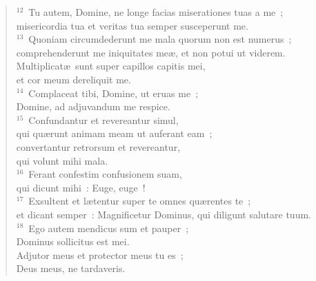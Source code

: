 \begin{flushleft}
\begin{verse}
${}^{12}$~Tu autem, Domine, ne longe facias miserationes tuas a me~;\\ misericordia tua et veritas tua semper susceperunt me.\\
${}^{13}$~Quoniam circumdederunt me mala quorum non est numerus~;\\ comprehenderunt me iniquitates me\ae , et non potui ut viderem.\\ Multiplicat\ae\ sunt super capillos capitis mei,\\ et cor meum dereliquit me.\\
${}^{14}$~Complaceat tibi, Domine, ut eruas me~;\\ Domine, ad adjuvandum me respice.\\
${}^{15}$~Confundantur et revereantur simul,\\ qui qu\ae runt animam meam ut auferant eam~;\\ convertantur retrorsum et revereantur,\\ qui volunt mihi mala.\\
${}^{16}$~Ferant confestim confusionem suam,\\ qui dicunt mihi~: Euge, euge~!\\
${}^{17}$~Exsultent et l\ae tentur super te omnes qu\ae rentes te~;\\ et dicant semper~: Magnificetur Dominus, qui diligunt salutare tuum.\\
${}^{18}$~Ego autem mendicus sum et pauper~;\\ Dominus sollicitus est mei.\\ Adjutor meus et protector meus tu es~;\\ Deus meus, ne tardaveris.\end{verse}\end{flushleft}



